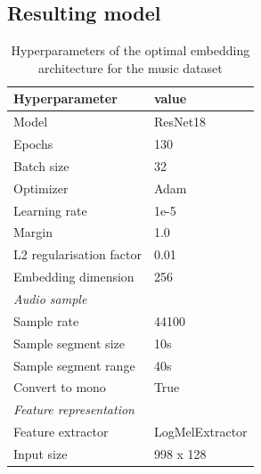 \subsection{Resulting model}
\label{sub:Results-Music-Resulting-Model}
\begin{table}[ht]
    \centering
    \caption{Hyperparameters of the optimal embedding architecture for the music dataset}
	\label{tab:Hyperparameters-Music}
    \begin{tabular}{l|l}
        \toprule
        \textbf{Hyperparameter} & \textbf{value} \\ 
        \midrule[1pt]
        Model & ResNet18 \\ 
        \hline
        Epochs & 130 \\ 
        \hline
        Batch size & 32 \\ 
        \hline
        Optimizer & Adam \\ 
        \hline
        Learning rate & 1e-5 \\
        \hline
        Margin & 1.0 \\
        \hline
        L2 regularisation factor & 0.01 \\
        \hline
        Embedding dimension & 256 \\
        \midrule[1pt]
        \multicolumn{2}{l}{\textit{Audio sample}} \\
        \midrule[1pt]
        Sample rate & 44100 \\ 
        \hline
        Sample segment size & 10s \\
        \hline
        Sample segment range & 40s \\
        \hline
        Convert to mono & True \\
        \midrule[1pt]
        \multicolumn{2}{l}{\textit{Feature representation}} \\
        \midrule[1pt]
        Feature extractor & LogMelExtractor \\ 
        \hline
        Input size & 998 x 128 \\
        \bottomrule
    \end{tabular}
\end{table}
\noindent
